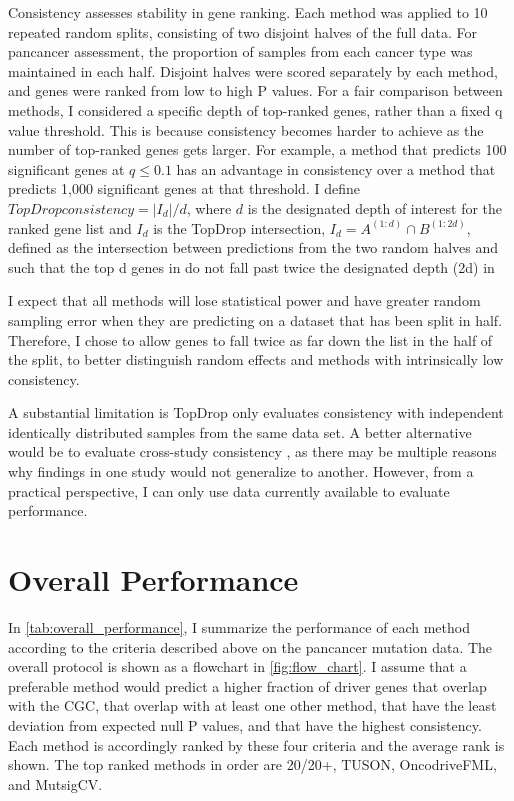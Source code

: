 Consistency assesses stability in gene ranking. Each method was applied to 10 repeated random splits, consisting of two disjoint halves of the full data. For pancancer assessment, the proportion of samples from each cancer type was maintained in each half. Disjoint halves were scored separately by each method, and genes were ranked from low to high P values. For a fair comparison between methods, I considered a specific depth of top-ranked genes, rather than a fixed q value threshold. This is because consistency becomes harder to achieve as the number of top-ranked genes gets larger. For example, a method that predicts 100 significant genes at $q \leq 0.1$ has an advantage in consistency over a method that predicts 1,000 significant genes at that threshold. I define $TopDrop consistency=|I_d |/d$, where $d$ is the designated depth of interest for the ranked gene list and $I_d$ is the TopDrop intersection, $I_d=A^{(1:d)} \cap B^{(1:2d)}$, defined as the intersection between predictions from the two random halves  and  such that the top d genes in  do not fall past twice the designated depth (2d) in 

I expect that all methods will lose statistical power and have greater random sampling error when they are predicting on a dataset that has been split in half. Therefore, I chose to allow genes to fall twice as far down the list in the  half of the split, to better distinguish random effects and methods with intrinsically low consistency.

A substantial limitation is TopDrop only evaluates consistency with independent identically distributed samples from the same data set. A better alternative would be to evaluate cross-study consistency \cite{RN157}, as there may be multiple reasons why findings in one study would not generalize to another. However, from a practical perspective, I can only use data currently available to evaluate performance.

\section{Overall Performance}

In \autoref{tab:overall_performance}, I summarize the performance of each method according to the criteria described above on the pancancer mutation data. The overall protocol is shown as a flowchart in \autoref{fig:flow_chart}. I assume that a preferable method would predict a higher fraction of driver genes that overlap with the CGC, that overlap with at least one other method, that have the least deviation from expected null P values, and that have the highest consistency. Each method is accordingly ranked by these four criteria and the average rank is shown. The top ranked methods in order are 20/20+, TUSON, OncodriveFML, and MutsigCV.

